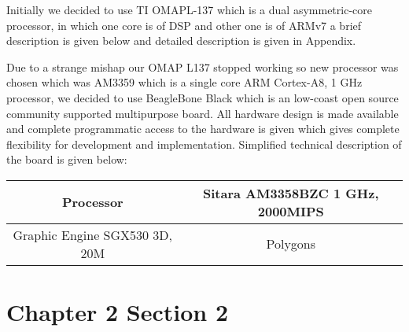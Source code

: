 Initially we decided to use TI OMAPL-137 which is a dual asymmetric-core processor, in which one core is of DSP and other one is of ARMv7 a brief description is given below and detailed description is given in Appendix.
 
Due to a strange mishap our OMAP L137 stopped working so new processor was chosen which was AM3359 which is a single core ARM Cortex-A8, 1 GHz processor, we decided to use BeagleBone Black which is an low-coast open source community supported multipurpose board. All hardware design is made available and complete programmatic access to the hardware is given which gives complete flexibility for development and implementation. Simplified technical description of the board is given below:
\begin{table}
		\begin{center}
			\setlength\arrayrulewidth{1pt}
			\begin{tabular}{|c|c|}
				\hline
				Processor & Sitara AM3358BZC 1 GHz, 2000MIPS\\
				\hline
				Graphic Engine  SGX530 3D, 20M & Polygons\\
				\hline
			\end{tabular}
		\end{center}
\end{table}


\section{Chapter 2 Section 2}
